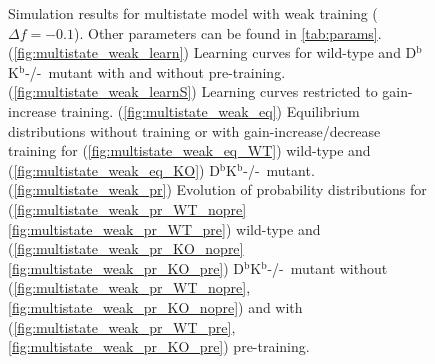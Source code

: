 \documentclass[12pt]{article}
\newcommand{\KO}{D$^\mathrm{b}$K$^\mathrm{b}$-/-}
\begin{document}
\begin{figure}
 \begin{center}
 \begin{myenuma}
  \item{}\label{fig:multistate_weak_learn}
  \item{}\label{fig:multistate_weak_learnS}
  \item\label{fig:multistate_weak_eq}\begin{myenumi}
                    \item{}\label{fig:multistate_weak_eq_WT}
                    \item{}\label{fig:multistate_weak_eq_KO}
                  \end{myenumi}
  \item\label{fig:multistate_weak_pr}\begin{myenumi}
                    \item{}\label{fig:multistate_weak_pr_WT_nopre}
                    \item{}\label{fig:multistate_weak_pr_WT_pre}
                    \item{}\label{fig:multistate_weak_pr_KO_nopre}
                    \item{}\label{fig:multistate_weak_pr_KO_pre}
                  \end{myenumi}
 \end{myenuma}
 \end{center}
  \caption{Simulation results for multistate model with weak training ($\Delta f=-0.1$).
  Other parameters can be found in \autoref{tab:params}.
  (\ref{fig:multistate_weak_learn}) Learning curves for wild-type and \KO\ mutant with and without pre-training.
  (\ref{fig:multistate_weak_learnS}) Learning curves restricted to gain-increase training.
  (\ref{fig:multistate_weak_eq}) Equilibrium distributions without training or with gain-increase/decrease training for (\ref{fig:multistate_weak_eq_WT}) wild-type and (\ref{fig:multistate_weak_eq_KO}) \KO\ mutant.
  (\ref{fig:multistate_weak_pr}) Evolution of probability distributions for (\ref{fig:multistate_weak_pr_WT_nopre}\ref{fig:multistate_weak_pr_WT_pre}) wild-type and  (\ref{fig:multistate_weak_pr_KO_nopre}\ref{fig:multistate_weak_pr_KO_pre}) \KO\ mutant without (\ref{fig:multistate_weak_pr_WT_nopre},\ref{fig:multistate_weak_pr_KO_nopre}) and with (\ref{fig:multistate_weak_pr_WT_pre},\ref{fig:multistate_weak_pr_KO_pre}) pre-training. } \label{fig:multistate_weak}
\end{figure}
\end{document}
